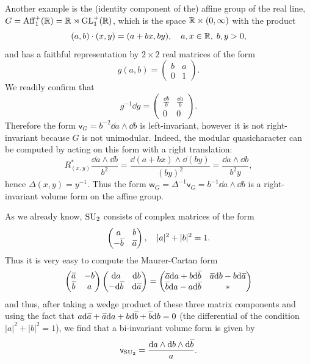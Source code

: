 \begin{example}
    Another example is the (identity component of the) affine group of the real line, $G=\operatorname{Aff}^+_1(\mathbb{R})=\mathbb{R}\rtimes\operatorname{GL}_1^+(\mathbb{R})$, which is the space $\mathbb{R}\times(0,\infty)$ with the product
    \[(a,b)\cdot (x,y)=(a+bx,by),\quad a,x\in\mathbb{R},\;b,y>0,\]
    and has a faithful representation by $2\times 2$ real matrices of the form
    \[g(a,b)=\begin{pmatrix}
        b & a\\ 0&1
    \end{pmatrix}.\]
    We readily confirm that
    \[g^{-1}\dd g=\begin{pmatrix}
        \frac{\dd b}{b} & \frac{\dd a}{b}\\ 0&0
    \end{pmatrix}. \]
    Therefore the form $\mathsf{v}_G=b^{-2}\dd a\wedge \dd b$ is left-invariant, however it is not right-invariant because $G$ is not unimodular. Indeed, the modular quasicharacter can be computed by acting on this form with a right translation:
    \[R_{(x,y)}^\ast \frac{\dd a \wedge \dd b}{b^2}=\frac{\dd (a+bx) \wedge \dd (by)}{(by)^2}=\frac{\dd a\wedge \dd b}{b^2 y},\]
    hence $\Delta(x,y)=y^{-1}$. Thus the form $\mathsf{w}_G=\Delta^{-1}\mathsf{v}_G=b^{-1}\dd a\wedge\dd b$ is a right-invariant volume form on the affine group.
\end{example}


\begin{xca}
    As we already know, $\operatorname{SU}_2$ consists of complex matrices of the form
    \[\begin{pmatrix}
        a&b\\-\wb{b}&\wb{a}
    \end{pmatrix},\quad |a|^2+|b|^2=1.\]
    Thus it is very easy to compute the Maurer-Cartan form
    \[\begin{pmatrix}
        \wb{a}&-b\\\wb{b}&a
    \end{pmatrix} 
    \begin{pmatrix}
        \dd a&\dd b\\-\dd \wb{b}&\dd \wb{a}
    \end{pmatrix}=
    \begin{pmatrix}
        \wb{a}\dd a+b\dd\wb{b} &\wb{a}\dd b-b\dd\wb{a}\\
        \wb{b}\dd a-a\dd\wb{b} & \ast
    \end{pmatrix}
    \]
    and thus, after taking a wedge product of these three matrix components and using the fact that $a\dd\wb{a}+\wb{a}\dd a+b\dd\wb{b}+\wb{b}\dd b=0$ (the differential of the condition $|a|^2+|b|^2=1$), we find that a bi-invariant volume form is given by
    \[\mathsf{v}_{\SU_2}=\frac{\dd a\wedge \dd b\wedge \dd\wb{b}}{a}.\]
\end{xca}

